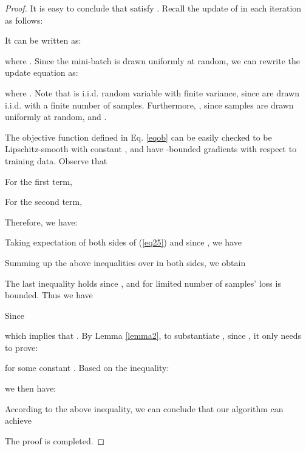 \documentclass{article}
\begin{document}
	\begin{proof}
		It is easy to conclude that 
		 satisfy .
		Recall the update of  in each iteration as follows:\vspace{-4mm}
		
		It can be written as:
		
		where . Since the mini-batch  is drawn uniformly at random, we can rewrite the update equation as:
		
		where .
		Note that  is i.i.d. random variable with finite variance, since  are drawn i.i.d. with a finite number of samples. Furthermore, , since samples are drawn uniformly at random, and .
		
		The objective function  defined in Eq. \ref{eqob} can be easily checked to be Lipschitz-smooth with constant , and have -bounded gradients with respect to training data.
		Observe that
		\begin{tiny}
			
		\end{tiny}


		For the first term,
		\begin{scriptsize}
			
		\end{scriptsize}
		For the second term,
		\begin{scriptsize}
			
		\end{scriptsize}
		Therefore, we have:
		\begin{scriptsize}
			
		\end{scriptsize}
		Taking expectation of both sides of (\ref{eq25}) and since , we have
		\begin{tiny}
			
		\end{tiny}
		Summing up the above inequalities over  in both sides, we obtain 
		\begin{tiny}
			 
		\end{tiny}
		The last inequality holds since , and  for limited number of samples' loss is bounded. Thus we have 
		\begin{tiny}
			
		\end{tiny}
		Since 
		
		which implies that .
		By Lemma \ref{lemma2}, to substantiate , since , it only needs to prove:
		
		for some constant . Based on the inequality:
		
		we then have:
		\begin{tiny}
			
		\end{tiny}
		According to the above inequality, we can conclude that our algorithm can achieve
		
		The proof is completed.
	\end{proof}
	
\end{document}
